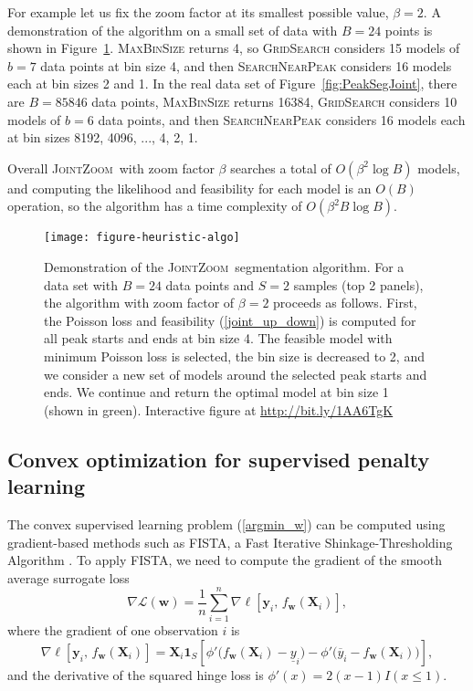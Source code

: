 \documentclass{article} %
\newcommand{\JointHeuristic}{\textsc{JointZoom}}
\begin{document}
For example let us fix the zoom factor at its smallest possible value,
$\beta=2$. A demonstration of the algorithm on a small set of data
with $B=24$ points is shown in
Figure~\ref{fig:heuristic-algo}. \textsc{MaxBinSize} returns 4, so
\textsc{GridSearch} considers 15 models of $b=7$ data points at bin
size 4, and then \textsc{SearchNearPeak} considers 16 models each at
bin sizes 2 and 1. In the real data set of
Figure~\ref{fig:PeakSegJoint}, there are $B=85846$ data points,
\textsc{MaxBinSize} returns 16384, \textsc{GridSearch} considers 10
models of $b=6$ data points, and then \textsc{SearchNearPeak}
considers 16 models each at bin sizes 8192, 4096, ..., 4, 2, 1.

Overall \JointHeuristic\ with zoom factor $\beta$ searches a total of
$O(\beta^2\log B)$ models, and computing the likelihood and
feasibility for each model is an $O(B)$ operation, so the algorithm
has a time complexity of $O(\beta^2 B\log B)$.

\begin{figure}[b!]
  \centering
  \texttt{[image: figure-heuristic-algo]}
  \vskip -0.5cm
  \caption{Demonstration of the \JointHeuristic\ segmentation
    algorithm. For a data set with $B=24$ data points and $S=2$
    samples (top 2 panels), the algorithm with zoom factor of
    $\beta=2$ proceeds as follows. First, the Poisson loss and
    feasibility (\ref{joint_up_down}) is computed for all 
    peak starts and ends at bin size 4. The feasible model with
    minimum Poisson loss is selected, the bin size is decreased to 2,
    and we consider a new set of models around the selected peak
    starts and ends. We continue and return the optimal model at bin
    size 1 (shown in green). Interactive figure at
    \url{http://bit.ly/1AA6TgK}}
  \label{fig:heuristic-algo}
\end{figure}

\subsection{Convex optimization for supervised penalty learning}

The convex supervised learning problem (\ref{argmin_w}) can be
computed using gradient-based methods such as FISTA, a Fast Iterative
Shinkage-Thresholding Algorithm \citep{fista}. To apply FISTA, we need
to compute the gradient of the smooth average surrogate loss
\begin{equation}
  \label{eq:average_gradient}
  \nabla \mathcal L(\mathbf w) = 
  \frac 1 n
  \sum_{i=1}^n 
  \nabla \ell \left[
    \mathbf y_i,\,
    f_{\mathbf w}(  \mathbf X_i )
  \right],
\end{equation}
where the gradient of one observation $i$ is
\begin{equation}
  \label{eq:one_gradient}
  \nabla \ell \left[
    \mathbf y_i,\,
    f_{\mathbf w}( \mathbf X_i )
  \right]
  =
  \mathbf X_i \mathbf 1_S
  \left[
    \phi'\big(
    f_{\mathbf w}( \mathbf X_i ) - \underline y_i
    \big)
    -
    \phi'\big(
    \overline y_i - f_{\mathbf w}( \mathbf X_i )
    \big)
  \right],
\end{equation}
and the derivative of the squared hinge loss is $\phi'(x)=2(x-1)I(x\leq 1)$.
\end{document}
